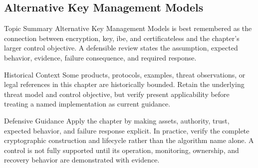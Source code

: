 \documentclass[11pt,letterpaper]{article}
\begin{document}
\subsection*{Alternative Key Management Models}
\begin{CornellNotesTable}
\end{CornellNotesTable}
\begin{CornellSummaryBox}{Topic Summary}
Alternative Key Management Models is best remembered as the connection between encryption, key, ibe, and certificateless and the chapter's larger control objective. A defensible review states the assumption, expected behavior, evidence, failure consequence, and required response.
\end{CornellSummaryBox}
\begin{CornellWarningBox}{Historical Context}
Some products, protocols, examples, threat observations, or legal references in this chapter are historically bounded. Retain the underlying threat model and control objective, but verify present applicability before treating a named implementation as current guidance.
\end{CornellWarningBox}
\begin{CornellOverviewBox}{Defensive Guidance}
Apply the chapter by making assets, authority, trust, expected behavior, and failure response explicit. In practice, verify the complete cryptographic construction and lifecycle rather than the algorithm name alone. A control is not fully supported until its operation, monitoring, ownership, and recovery behavior are demonstrated with evidence.
\end{CornellOverviewBox}
\end{document}
